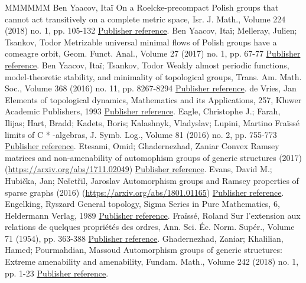 \begin{thebibliography}{MMMMMM}
 Ben Yaacov, Itaï On a Roelcke-precompact Polish groups that cannot act transitively on a complete metric space, Isr. J. Math., Volume 224 (2018) no. 1, pp. 105-132 \href{https://ahl.centre-mersenne.org/item/AHL_2019__2__149_0/#BY}{Publisher reference}.
 Ben Yaacov, Itaï; Melleray, Julien; Tsankov, Todor Metrizable universal minimal flows of Polish groups have a comeagre orbit, Geom. Funct. Anal., Volume 27 (2017) no. 1, pp. 67-77 \href{https://ahl.centre-mersenne.org/item/AHL_2019__2__149_0/#BYMT}{Publisher reference}.
 Ben Yaacov, Itaï; Tsankov, Todor Weakly almost periodic functions, model-theoretic stability, and minimality of topological groups, Trans. Am. Math. Soc., Volume 368 (2016) no. 11, pp. 8267-8294 \href{https://ahl.centre-mersenne.org/item/AHL_2019__2__149_0/#BYT}{Publisher reference}.
 de Vries, Jan Elements of topological dynamics, Mathematics and its Applications, 257, Kluwer Academic Publishers, 1993 \href{https://ahl.centre-mersenne.org/item/AHL_2019__2__149_0/#dV}{Publisher reference}.
 Eagle, Christophe J.; Farah, Ilijas; Hart, Bradd; Kadets, Boris; Kalashnyk, Vladyslav; Lupini, Martino Fraïssé limits of C * -algebras, J. Symb. Log., Volume 81 (2016) no. 2, pp. 755-773 \href{https://ahl.centre-mersenne.org/item/AHL_2019__2__149_0/#EFHKKL}{Publisher reference}.
 Etesami, Omid; Ghadernezhad, Zaniar Convex Ramsey matrices and non-amenability of automophism groups of generic structures (2017) (\url{https://arxiv.org/abs/1711.02049}) \href{https://ahl.centre-mersenne.org/item/AHL_2019__2__149_0/#EG}{Publisher reference}.
 Evans, David M.; Hubička, Jan; Nešetřil, Jaroslav Automorphism groups and Ramsey properties of sparse graphs (2016) (\url{https://arxiv.org/abs/1801.01165}) \href{https://ahl.centre-mersenne.org/item/AHL_2019__2__149_0/#EHN}{Publisher reference}.
 Engelking, Ryszard General topology, Sigma Series in Pure Mathematics, 6, Heldermann Verlag, 1989 \href{https://ahl.centre-mersenne.org/item/AHL_2019__2__149_0/#Eng}{Publisher reference}.
 Fraïssé, Roland Sur l’extension aux relations de quelques propriétés des ordres, Ann. Sci. Éc. Norm. Supér., Volume 71 (1954), pp. 363-388 \href{https://ahl.centre-mersenne.org/item/AHL_2019__2__149_0/#Fr0}{Publisher reference}.
 Ghadernezhad, Zaniar; Khalilian, Hamed; Pourmahdian, Massoud Automorphism groups of generic structures: Extreme amenability and amenability, Fundam. Math., Volume 242 (2018) no. 1, pp. 1-23 \href{https://ahl.centre-mersenne.org/item/AHL_2019__2__149_0/#GKP}{Publisher reference}.

\end{thebibliography}
